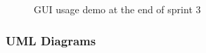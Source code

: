 \documentclass[11pt]{article} %
\begin{document}
  \begin{figure}[H]
  	\centering
  	\caption{GUI usage demo at the end of sprint 3}
  	\label{fig:GUI Design 5 demo}
  \end{figure}
  
  


\newpage
\subsubsection{UML Diagrams}
\end{document}
